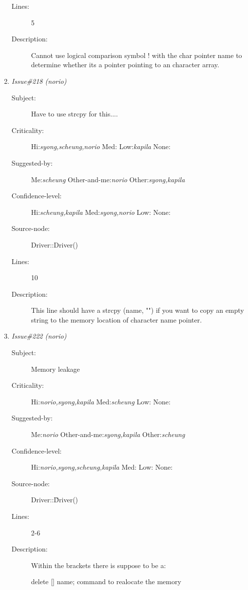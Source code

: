 \begin{enumerate}
\begin{description}
\item [Lines:] 5

\item [Description:] Cannot use logical comparison symbol ! with the char
 pointer name to determine whether its a pointer pointing
 to an character array.
\end{description}
\item {\it Issue\#218 (norio)}
\begin{description}
\item [Subject:] Have to use strcpy for this....
\item [Criticality:] Hi:{\it syong,scheung,norio} Med:{\it } Low:{\it kapila} None:{\it }
\item [Suggested-by:] Me:{\it scheung} Other-and-me:{\it norio} Other:{\it syong,kapila}
\item [Confidence-level:] Hi:{\it scheung,kapila} Med:{\it syong,norio} Low:{\it } None:{\it }
\item [Source-node:] Driver::Driver()

\item [Lines:] 10

\item [Description:] This line should have a strcpy (name, "") if you want
 to copy an empty string to the memory location of
 character name pointer.
\end{description}
\item {\it Issue\#222 (norio)}
\begin{description}
\item [Subject:] Memory leakage
\item [Criticality:] Hi:{\it norio,syong,kapila} Med:{\it scheung} Low:{\it } None:{\it }
\item [Suggested-by:] Me:{\it norio} Other-and-me:{\it syong,kapila} Other:{\it scheung}
\item [Confidence-level:] Hi:{\it norio,syong,scheung,kapila} Med:{\it } Low:{\it } None:{\it }
\item [Source-node:] Driver::\~Driver()

\item [Lines:] 2-6

\item [Description:] Within the brackets there is suppose to be a:

 delete [] name; command to realocate the memory
  

\end{description}
\end{enumerate}
